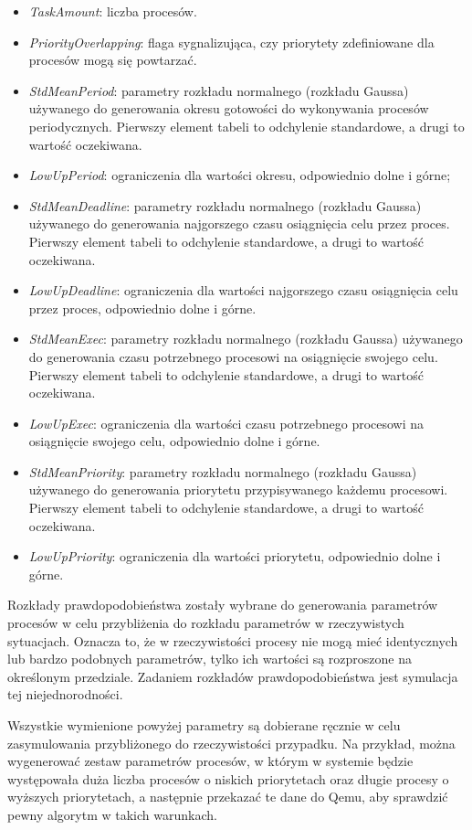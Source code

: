 \documentclass[../../main]{subfiles}
\begin{document}
\begin{itemize}
    \item \textit{TaskAmount}: liczba procesów.
    \item \textit{PriorityOverlapping}: flaga sygnalizująca, czy priorytety zdefiniowane dla procesów mogą się powtarzać.
    \item \textit{StdMeanPeriod}: parametry rozkładu normalnego (rozkładu Gaussa) używanego do generowania okresu gotowości do wykonywania procesów periodycznych. Pierwszy element tabeli to odchylenie standardowe, a drugi to wartość oczekiwana.
    \item \textit{LowUpPeriod}: ograniczenia dla wartości okresu, odpowiednio dolne i górne;
    \item \textit{StdMeanDeadline}: parametry rozkładu normalnego (rozkładu Gaussa) używanego do generowania najgorszego czasu osiągnięcia celu przez proces. Pierwszy element tabeli to odchylenie standardowe, a drugi to wartość oczekiwana.
    \item \textit{LowUpDeadline}: ograniczenia dla wartości najgorszego czasu osiągnięcia celu przez proces, odpowiednio dolne i górne.
    \item \textit{StdMeanExec}: parametry rozkładu normalnego (rozkładu Gaussa) używanego do generowania czasu potrzebnego procesowi na osiągnięcie swojego celu. Pierwszy element tabeli to odchylenie standardowe, a drugi to wartość oczekiwana.
    \item \textit{LowUpExec}: ograniczenia dla wartości czasu potrzebnego procesowi na osiągnięcie swojego celu, odpowiednio dolne i górne.
    \item \textit{StdMeanPriority}: parametry rozkładu normalnego (rozkładu Gaussa) używanego do generowania priorytetu przypisywanego każdemu procesowi. Pierwszy element tabeli to odchylenie standardowe, a drugi to wartość oczekiwana.
    \item \textit{LowUpPriority}: ograniczenia dla wartości priorytetu, odpowiednio dolne i górne.
\end{itemize}

Rozkłady prawdopodobieństwa zostały wybrane do generowania parametrów procesów w celu przybliżenia do rozkładu parametrów w rzeczywistych sytuacjach. Oznacza to, że w rzeczywistości procesy nie mogą mieć identycznych lub bardzo podobnych parametrów, tylko ich wartości są rozproszone na określonym przedziale. Zadaniem rozkładów prawdopodobieństwa jest symulacja tej niejednorodności.

Wszystkie wymienione powyżej parametry są dobierane ręcznie w celu zasymulowania przybliżonego do rzeczywistości przypadku. Na przykład, można wygenerować zestaw parametrów procesów, w którym w systemie będzie występowała duża liczba procesów o niskich priorytetach oraz długie procesy o wyższych priorytetach, a następnie przekazać te dane do Qemu, aby sprawdzić pewny algorytm w takich warunkach.
\end{document}
